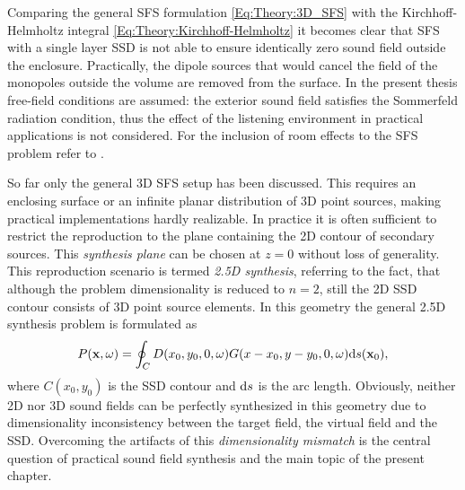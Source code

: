 Comparing the general SFS formulation \eqref{Eq:Theory:3D_SFS} with the Kirchhoff-Helmholtz integral \eqref{Eq:Theory:Kirchhoff-Helmholtz} it becomes clear that SFS with a single layer SSD is not able to ensure identically zero sound field outside the enclosure. Practically, the dipole sources that would cancel the field of the monopoles outside the volume are removed from the surface.
In the present thesis free-field conditions are assumed: the exterior sound field satisfies the Sommerfeld radiation condition, thus the effect of the listening environment in practical applications is not considered. For the inclusion of room effects to the SFS problem refer to \cite{Spors2005}.
%

\vspace{3mm}
So far only the general 3D SFS setup has been discussed.
This requires an enclosing surface or an infinite planar distribution of 3D point sources, making practical implementations hardly realizable.
In practice it is often sufficient to restrict the reproduction to the plane containing the 2D contour of secondary sources.
This \emph{synthesis plane} can be chosen at $z=0$ without loss of generality.
This reproduction scenario is termed \emph{2.5D synthesis}, referring to the fact, that although the problem dimensionality is reduced to $n=2$, still the 2D SSD contour consists of 3D point source elements.
In this geometry the general 2.5D synthesis problem is formulated as
\begin{equation}
P(\mathbf{x},\omega) = \oint_{C} D(x_0,y_0,0,\omega) G(x - x_0, y-y_0, 0 , \omega ) \mathrm{d} s( \mathbf{x}_0 ),
\label{Eq:Theory:25D_SFS}
\end{equation}
where $C(x_0,y_0)$ is the SSD contour and $\mathrm{d} s$ is the arc length.
Obviously, neither 2D nor 3D sound fields can be perfectly synthesized in this geometry due to dimensionality inconsistency between the target field, the virtual field and the SSD.
Overcoming the artifacts of this \emph{dimensionality mismatch} is the central question of practical sound field synthesis and the main topic of the present chapter.

